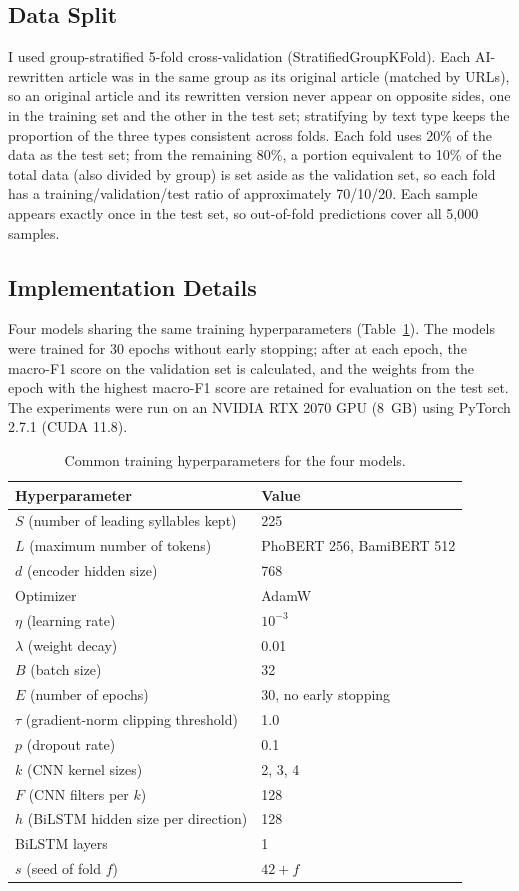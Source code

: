 \documentclass[conference,a4paper]{IEEEtran}
\begin{document}
\subsection{Data Split}
I used group-stratified 5-fold cross-validation (StratifiedGroupKFold). Each AI-rewritten article was in the same group as its original article (matched by URLs), so an original article and its rewritten version never appear on opposite sides, one in the training set and the other in the test set; stratifying by text type keeps the proportion of the three types consistent across folds. Each fold uses 20\% of the data as the test set; from the remaining 80\%, a portion equivalent to 10\% of the total data (also divided by group) is set aside as the validation set, so each fold has a training/validation/test ratio of approximately 70/10/20. Each sample appears exactly once in the test set, so out-of-fold predictions cover all 5,000 samples.

\subsection{Implementation Details}
Four models sharing the same training hyperparameters (Table~\ref{tab:hparams}). The models were trained for 30 epochs without early stopping; after at each epoch, the macro-F1 score on the validation set is calculated, and the weights from the epoch with the highest macro-F1 score are retained for evaluation on the test set. The experiments were run on an NVIDIA RTX 2070 GPU (8~GB) using PyTorch 2.7.1 (CUDA 11.8).

\begin{table}[t]
  \centering
  \caption{Common training hyperparameters for the four models.}
  \label{tab:hparams}
  \setlength{\tabcolsep}{4pt}
  \begin{tabular}{ll}
    \toprule
    Hyperparameter & Value \\
    \midrule
    $S$ (number of leading syllables kept) & 225 \\
    $L$ (maximum number of tokens) & PhoBERT 256, BamiBERT 512 \\
    $d$ (encoder hidden size) & 768 \\
    Optimizer & AdamW \cite{adamw} \\
    $\eta$ (learning rate) & $10^{-3}$ \\
    $\lambda$ (weight decay) & 0.01 \\
    $B$ (batch size) & 32 \\
    $E$ (number of epochs) & 30, no early stopping \\
    $\tau$ (gradient-norm clipping threshold) & 1.0 \\
    $p$ (dropout rate) & 0.1 \\
    $k$ (CNN kernel sizes) & 2, 3, 4 \\
    $F$ (CNN filters per $k$) & 128 \\
    $h$ (BiLSTM hidden size per direction) & 128 \\
    BiLSTM layers & 1 \\
    $s$ (seed of fold $f$) & $42 + f$ \\
    \bottomrule
  \end{tabular}
\end{table}
\end{document}
